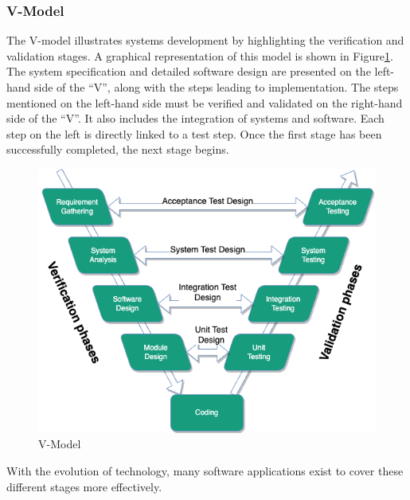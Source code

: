     
\subsubsection{V-Model}
The V-model illustrates systems development by highlighting the verification and validation stages. A graphical representation of this model is shown in Figure\ref{fig:v-model}. The system specification and detailed software design are presented on the left-hand side of the “V”, along with the steps leading to implementation. The steps mentioned on the left-hand side must be verified and validated on the right-hand side of the “V”. It also includes the integration of systems and software. Each step on the left is directly linked to a test step. Once the first stage has been successfully completed, the next stage begins.\\

\begin{figure}[H]
    \centering
    \includegraphics[scale=0.6]{images/V-Model.png}
    \caption{\label{fig:v-model} V-Model \cite{clark2009system} }
\end{figure}

With the evolution of technology, many software applications exist to cover these different stages more effectively. 